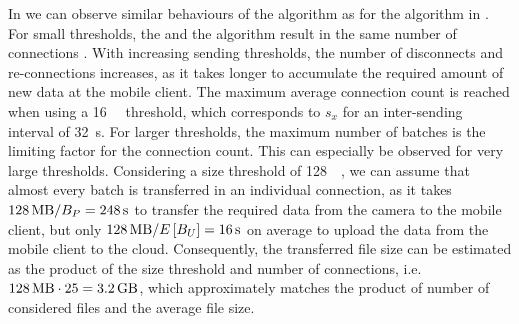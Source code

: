 In  we can observe similar behaviours of the \algosize algorithm as for the \algointerval algorithm in .
For small thresholds, the \algosize and the \algoimmediate algorithm result in the same number of connections \connectionCount .
With increasing sending thresholds, the number of disconnects and re-connections increases, as it takes longer to accumulate the required amount of new data at the mobile client.
The maximum average connection count \connectionCount is reached when using a \SI{16}{\mega\byte} threshold, which corresponds to \(s_x\) for an inter-sending interval of \SI{32}{\second}.
For larger thresholds, the maximum number of batches is the limiting factor for the connection count.
This can especially be observed for very large thresholds.
Considering a size threshold \thresholdSize of \SI{128}{\mega\byte}, we can assume that almost every batch is transferred in an individual connection, as it takes \(\SI{128}{\mega\byte} / \panTransferRate = \SI{248}{\second}\) to transfer the required data from the camera to the mobile client, but only \(\SI{128}{\mega\byte} / E\left[\uploadbandwidth\right] = \SI{16}{\second}\) on average to upload the data from the mobile client to the cloud.
Consequently, the transferred file size can be estimated as the product of the size threshold \thresholdSize and number of connections, i.e. \(\SI{128}{\mega\byte} \cdot 25 = \SI{3.2}{\giga\byte}\), which approximately matches the product of number of considered files and the average file size.

